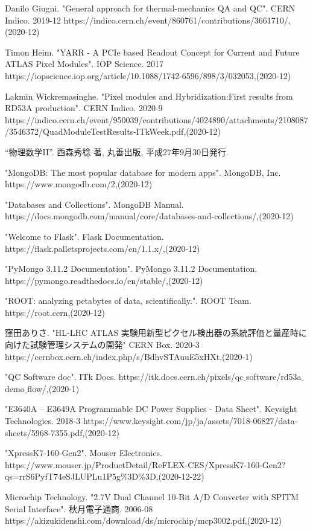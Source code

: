 \begin{thebibliography}{9}
Danilo Giugni. "General approach for thermal-mechanics QA and QC". CERN Indico. 2019-12
https://indico.cern.ch/event/860761/contributions/3661710/,(2020-12)

Timon Heim. "YARR - A PCIe based Readout Concept for Current and Future ATLAS Pixel Modules". IOP Science. 2017
https://iopscience.iop.org/article/10.1088/1742-6596/898/3/032053,(2020-12)

Lakmin Wickremasinghe. "Pixel modules and Hybridization:First results from RD53A production". CERN Indico. 2020-9
https://indico.cern.ch/event/950039/contributions/4024890/attachments/2108087/3546372/QuadModuleTestResults-ITkWeek.pdf,(2020-12)

“物理数学II”.
西森秀稔 著, 丸善出版, 平成27年9月30日発行.

"MongoDB: The most popular database for modern apps". MongoDB, Inc. 
https://www.mongodb.com/2,(2020-12)

"Databases and Collections". MongoDB Manual. 
https://docs.mongodb.com/manual/core/databases-and-collections/,(2020-12)

"Welcome to Flask". Flask Documentation. 
https://flask.palletsprojects.com/en/1.1.x/,(2020-12)

"PyMongo 3.11.2 Documentation". PyMongo 3.11.2 Documentation.
https://pymongo.readthedocs.io/en/stable/,(2020-12)

"ROOT: analyzing petabytes of data, scientifically.". ROOT Team. 
https://root.cern,(2020-12)

窪田ありさ. "HL-LHC ATLAS 実験用新型ピクセル検出器の系統評価と量産時に向けた試験管理システムの開発" CERN Box. 2020-3
https://cernbox.cern.ch/index.php/s/BdhvSTAuuE5xHXt,(2020-1)

"QC Software doc". ITk Docs. 
https://itk.docs.cern.ch/pixels/qc$\_$software/rd53a$\_$demo$\_$flow/,(2020-1)

"E3640A – E3649A Programmable DC Power Supplies - Data Sheet". Keysight Technologies. 2018-3
https://www.keysight.com/jp/ja/assets/7018-06827/data-sheets/5968-7355.pdf,(2020-12)

"XpressK7-160-Gen2". Mouser Electronics.
https://www.mouser.jp/ProductDetail/ReFLEX-CES/XpressK7-160-Gen2?qs=rrS6PyfT74eSJLUPLu1P5g\%3D\%3D,(2020-12-22)

Microchip Technology. "2.7V Dual Channel 10-Bit A/D Converter with SPITM Serial Interface". 秋月電子通商. 2006-08
https://akizukidenshi.com/download/ds/microchip/mcp3002.pdf,(2020-12)


\end{thebibliography}
